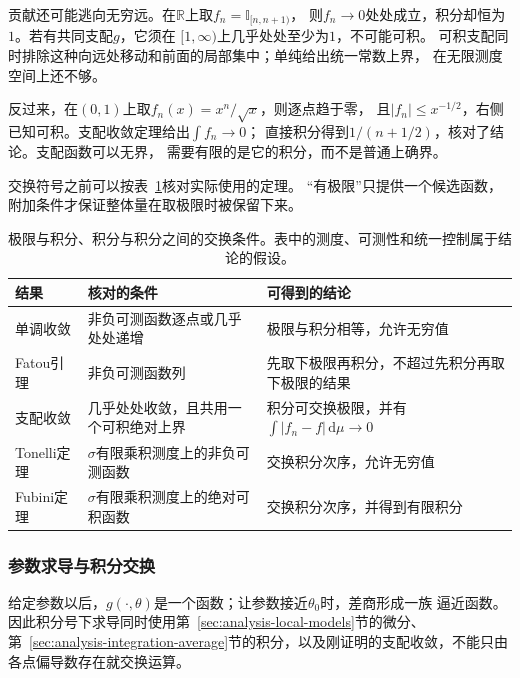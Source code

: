 贡献还可能逃向无穷远。在$\mathbb R$上取$f_n=\mathbb I_{[n,n+1)}$，
则$f_n\to0$处处成立，积分却恒为$1$。若有共同支配$g$，它须在
$[1,\infty)$上几乎处处至少为$1$，不可能可积。
可积支配同时排除这种向远处移动和前面的局部集中；单纯给出统一常数上界，
在无限测度空间上还不够。

反过来，在$(0,1)$上取$f_n(x)=x^n/\sqrt x$，则逐点趋于零，
且$|f_n|\leq x^{-1/2}$，右侧已知可积。支配收敛定理给出$\int f_n\to0$；
直接积分得到$1/(n+1/2)$，核对了结论。支配函数可以无界，
需要有限的是它的积分，而不是普通上确界。

交换符号之前可以按表~\ref{tab:analysis-interchange-conditions}核对实际使用的定理。
“有极限”只提供一个候选函数，附加条件才保证整体量在取极限时被保留下来。

\begin{table}[htbp]
 \centering\small
 \begin{tabularx}{\linewidth}{@{}lXX@{}}
 \toprule
 结果 & 核对的条件 & 可得到的结论\\
 \midrule
 单调收敛 & 非负可测函数逐点或几乎处处递增 & 极限与积分相等，允许无穷值\\
 Fatou引理 & 非负可测函数列 & 先取下极限再积分，不超过先积分再取下极限的结果\\
 支配收敛 & 几乎处处收敛，且共用一个可积绝对上界 & 积分可交换极限，并有$\int|f_n-f|\,\mathrm d\mu\to0$\\
 Tonelli定理 & $\sigma$有限乘积测度上的非负可测函数 & 交换积分次序，允许无穷值\\
 Fubini定理 & $\sigma$有限乘积测度上的绝对可积函数 & 交换积分次序，并得到有限积分\\
 \bottomrule
 \end{tabularx}
 \caption{极限与积分、积分与积分之间的交换条件。表中的测度、可测性和统一控制属于结论的假设。}
 \label{tab:analysis-interchange-conditions}
\end{table}

\subsubsection{参数求导与积分交换}

给定参数以后，$g(\cdot,\theta)$是一个函数；让参数接近$\theta_0$时，差商形成一族
逼近函数。因此积分号下求导同时使用第~\ref{sec:analysis-local-models}节的微分、
第~\ref{sec:analysis-integration-average}节的积分，以及刚证明的支配收敛，不能只由
各点偏导数存在就交换运算。


